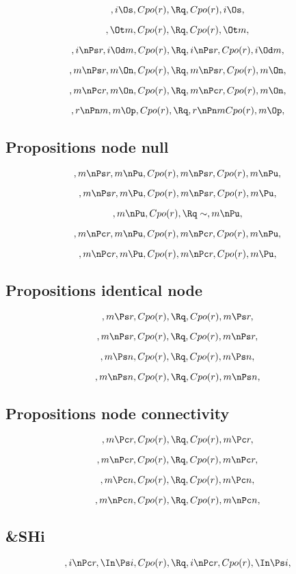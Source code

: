 \[, i \Os, Cpo(r), \Rq , Cpo(r), i \Os, \]

\[, \Ot m, Cpo(r), \Rq , Cpo(r), \Ot m, \]

\[, i \nPs r, i \Od m, Cpo(r), \Rq , i \nPs r, Cpo(r), i \Od m, \]

\[, m \nPs r, m \On, Cpo(r), \Rq , m \nPs r, Cpo(r), m \On, \]

\[, m \nPc r, m \On, Cpo(r), \Rq , m \nPc r, Cpo(r), m \On, \]

\[, r \nPn m, m \Op, Cpo(r), \Rq , r \nPn m Cpo(r), m \Op, \]


\bigskip
\bigskip
\subsection{Propositions node null}
\[, m \nPs r, m \nPu, Cpo(r), m \nPs r, Cpo(r), m \nPu, \]

\[, m \nPs r, m \Pu, Cpo(r), m \nPs r, Cpo(r), m \Pu, \]

\[, m \nPu, Cpo(r), \Rq \sim, m \nPu, \]

\[, m \nPc r, m \nPu, Cpo(r), m \nPc r, Cpo(r), m \nPu, \]

\[, m \nPc r, m \Pu, Cpo(r), m \nPc r, Cpo(r), m \Pu, \]


\bigskip
\bigskip
\subsection{Propositions identical node}
\[, m \Ps r, Cpo(r), \Rq , Cpo(r), m \Ps r, \]

\[, m \nPs r, Cpo(r), \Rq , Cpo(r), m \nPs r, \]



\[, m \Ps n, Cpo(r), \Rq , Cpo(r), m \Ps n, \]

\[, m \nPs n, Cpo(r), \Rq , Cpo(r), m \nPs n, \]


\bigskip
\bigskip
\subsection{Propositions  node connectivity}


\[, m \Pc r, Cpo(r), \Rq , Cpo(r), m \Pc r, \]

\[, m \nPc r, Cpo(r), \Rq , Cpo(r), m \nPc r, \]


\[, m \Pc n, Cpo(r), \Rq , Cpo(r), m \Pc n, \]

\[, m \nPc n, Cpo(r), \Rq , Cpo(r), m \nPc n, \]


\bigskip
\bigskip
\subsection{&SHi}
\[, i \nPc r, \In \Ps i, Cpo(r), \Rq , i \nPc r, Cpo(r), \In \Ps i, \]

